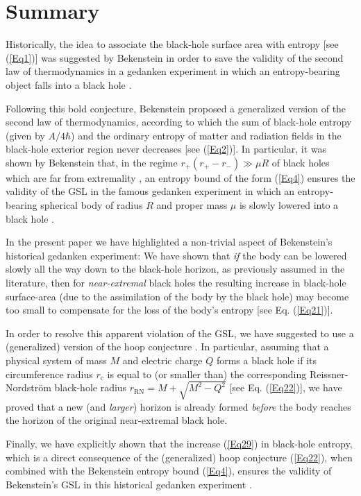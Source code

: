 \documentclass[12pt,preprintnumbers,amsmath,amssymbm,prd]{revtex4-1}
\begin{document}
\section{Summary}

Historically, the idea to associate the black-hole surface area with
entropy [see (\ref{Eq1})] was suggested by Bekenstein \cite{Bek73}
in order to save the validity of the second law of thermodynamics in
a gedanken experiment in which an entropy-bearing object falls into
a black hole \cite{WheLec,BekLec}.

Following this bold conjecture, Bekenstein \cite{Bek73} proposed a
generalized version of the second law of thermodynamics, according
to which the sum of black-hole entropy (given by $A/4\hbar$) and the
ordinary entropy of matter and radiation fields in the black-hole
exterior region never decreases [see (\ref{Eq2})]. In particular, it
was shown by Bekenstein \cite{Bek73} that, in the regime
$r_+(r_+-r_-)\gg\mu R$ of black holes which are far from extremality
\cite{Noteim,Noteimb}, an entropy bound of the form (\ref{Eq4})
ensures the validity of the GSL in the famous gedanken experiment in
which an entropy-bearing spherical body of radius $R$ and proper
mass $\mu$ is slowly lowered into a black hole \cite{Noteen}.

In the present paper we have highlighted a non-trivial aspect of
Bekenstein's historical gedanken experiment: We have shown that {\it
if} the body can be lowered slowly all the way down to the
black-hole horizon, as previously assumed in the literature, then
for {\it near-extremal} black holes the resulting increase in
black-hole surface-area (due to the assimilation of the body by the
black hole) may become too small to compensate for the loss of the
body's entropy [see Eq. (\ref{Eq21})].

In order to resolve this apparent violation of the GSL, we have
suggested to use a (generalized) version of the hoop conjecture
\cite{Thorne}. In particular, assuming that a physical system of
mass $M$ and electric charge $Q$ forms a black hole if its
circumference radius $r_{\text{c}}$ is equal to (or smaller than)
the corresponding Reissner-Nordstr\"om black-hole radius
$r_{\text{RN}}=M+\sqrt{M^2-Q^2}$ [see Eq. (\ref{Eq22})], we have
proved that a new (and {\it larger}) horizon is already formed {\it
before} the body reaches the horizon of the original near-extremal
black hole.

Finally, we have explicitly shown that the increase (\ref{Eq29}) in
black-hole entropy, which is a direct consequence of the
(generalized) hoop conjecture (\ref{Eq22}), when combined with the
Bekenstein entropy bound (\ref{Eq4}), ensures the validity of
Bekenstein's GSL in this historical gedanken experiment
\cite{Notetdb}.
\end{document}

